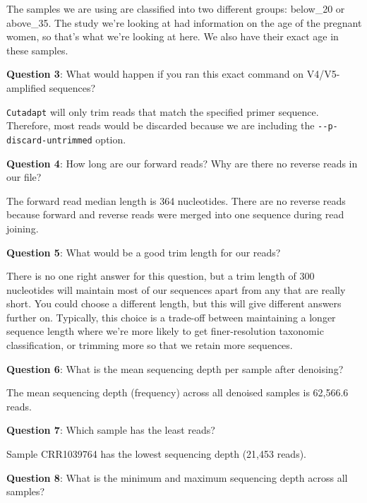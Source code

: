 \documentclass[
]{book}
\begin{document}
The samples we are using are classified into two different groups: below\_20 or above\_35. The study we're looking at had information on the age of the pregnant women, so that's what we're looking at here. We also have their exact age in these samples.

\textbf{Question 3}: What would happen if you ran this exact command on V4/V5-amplified sequences?

\texttt{Cutadapt} will only trim reads that match the specified primer sequence. Therefore, most reads would be discarded because we are including the \texttt{-\/-p-discard-untrimmed} option.

\textbf{Question 4}: How long are our forward reads? Why are there no reverse reads in our file?

The forward read median length is 364 nucleotides. There are no reverse reads because forward and reverse reads were merged into one sequence during read joining.

\textbf{Question 5}: What would be a good trim length for our reads?

There is no one right answer for this question, but a trim length of 300 nucleotides will maintain most of our sequences apart from any that are really short. You could choose a different length, but this will give different answers further on. Typically, this choice is a trade-off between maintaining a longer sequence length where we're more likely to get finer-resolution taxonomic classification, or trimming more so that we retain more sequences.

\textbf{Question 6}: What is the mean sequencing depth per sample after denoising?

The mean sequencing depth (frequency) across all denoised samples is 62,566.6 reads.

\textbf{Question 7}: Which sample has the least reads?

Sample CRR1039764 has the lowest sequencing depth (21,453 reads).

\textbf{Question 8}: What is the minimum and maximum sequencing depth across all samples?
\end{document}
